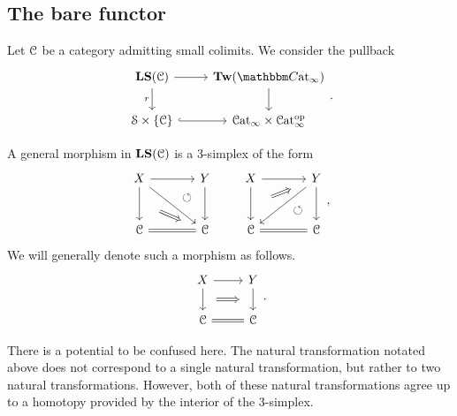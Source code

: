\documentclass[main.tex]{subfiles}
\begin{document}
\subsection{The bare functor}
\label{ssc:the_bare_functor}

Let $\mathcal{C}$ be a category admitting small colimits. We consider the pullback
\begin{equation*}
  \begin{tikzcd}
    \LS(\category{C})
    \arrow[r]
    \arrow[d, swap, "r"]
    & \Tw(\ICCat)
    \arrow[d]
    \\
    \S \times \{\category{C}\}
    \arrow[r, hook]
    & \ICat \times \ICat\op
  \end{tikzcd}.
\end{equation*}

A general morphism in $\mathbf{LS}(\mathcal{C})$ is a 3-simplex of the form
\begin{equation*}
  \begin{tikzcd}[column sep=large, row sep=large]
    X
    \arrow[r]
    \arrow[d, ""{name=L, right}]
    \arrow[dr]
    & Y
    \arrow[d, ""{name=R, left}]
    \arrow[from=l, to=R, phantom, near end, "\circlearrowleft"{description}]
    \\
    \category{C}
    & \category{C}
    \arrow[l, equals]
    \arrow[from=L, Rightarrow, shorten=3ex]
  \end{tikzcd}
  \qquad
  \begin{tikzcd}[column sep=large, row sep=large]
    X
    \arrow[r]
    \arrow[d, ""{name=L, right}]
    & Y
    \arrow[d, ""{name=R, left}]
    \arrow[dl]
    \\
    \category{C}
    \arrow[from=R, phantom, near start, "\circlearrowleft"{description}]
    & \category{C}
    \arrow[l, equals]
    \arrow[from=L, to=u, shorten=3ex, Rightarrow]
  \end{tikzcd},
\end{equation*}
We will generally denote such a morphism as follows.
\begin{equation*}
  \begin{tikzcd}
    X
    \arrow[r]
    \arrow[d, ""{name=L, right}]
    & Y
    \arrow[d, ""{name=R, left}]
    \\
    \category{C}
    & \category{C}
    \arrow[l, equals]
    \arrow[Rightarrow, from=L, to=R, shorten=1.5ex]
  \end{tikzcd}.
\end{equation*}

There is a potential to be confused here. The natural transformation notated above does not correspond to a single natural transformation, but rather to two natural transformations. However, both of these natural transformations agree up to a homotopy provided by the interior of the 3-simplex.
\end{document}
